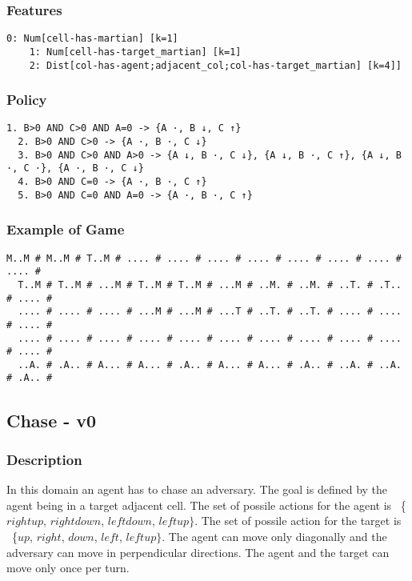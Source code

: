 \documentclass[a4paper]{article}
\begin{document}
\subsubsection{Features}
\begin{Verbatim}[fontsize=\footnotesize]
  0: Num[cell-has-martian] [k=1]
	1: Num[cell-has-target_martian] [k=1]
	2: Dist[col-has-agent;adjacent_col;col-has-target_martian] [k=4]]
\end{Verbatim}

\subsubsection{Policy}
\begin{Verbatim}[fontsize=\footnotesize]
  1. B>0 AND C>0 AND A=0 -> {A ·, B ↓, C ↑}
  2. B>0 AND C>0 -> {A ·, B ·, C ↓}
  3. B>0 AND C>0 AND A>0 -> {A ↓, B ·, C ↓}, {A ↓, B ·, C ↑}, {A ↓, B ·, C ·}, {A ·, B ·, C ↓}
  4. B>0 AND C=0 -> {A ·, B ·, C ↑}
  5. B>0 AND C=0 AND A=0 -> {A ·, B ·, C ↑}
\end{Verbatim}

\subsubsection{Example of Game}
\begin{Verbatim}[fontsize=\footnotesize]
  M..M # M..M # T..M # .... # .... # .... # .... # .... # .... # .... # .... #
  T..M # T..M # ...M # T..M # T..M # ...M # ..M. # ..M. # ..T. # .T.. # .... #
  .... # .... # .... # ...M # ...M # ...T # ..T. # ..T. # .... # .... # .... #
  .... # .... # .... # .... # .... # .... # .... # .... # .... # .... # .... #
  ..A. # .A.. # A... # A... # .A.. # A... # A... # .A.. # ..A. # ..A. # .A.. #
\end{Verbatim}

\subsection{Chase - v0}
\subsubsection{Description}
In this domain an agent has to chase an adversary. The goal is defined by the agent being in a target adjacent cell. The set of possile actions for the agent is ~\{$rightup$, $rightdown$, $leftdown$, $leftup\}$.
The set of possile action for the target is ~\{$up$, $right$, $down$, $left$, $leftup\}$. The agent can move only diagonally and the adversary can move in perpendicular directions.  The agent and the target can move only once per turn.
\end{document}
